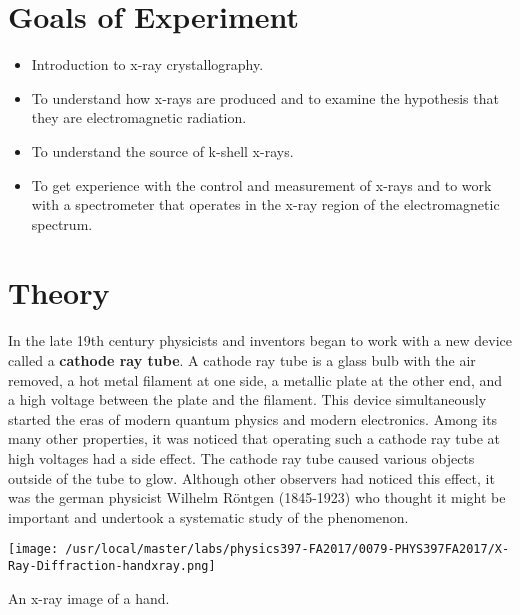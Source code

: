 \section{Goals of Experiment}
\begin{itemize}
\item Introduction to x-ray crystallography.
    \item To understand how x-rays are produced and to examine the hypothesis that they are electromagnetic radiation.
    \item To understand the source of k-shell x-rays.
    \item To get experience with the control and measurement of x-rays and to work with a spectrometer that operates in the x-ray region of the electromagnetic spectrum.
\end{itemize}

\section{Theory}
In the late 19th century physicists and inventors began to work with a new device called a {\bf cathode ray tube}. A cathode ray tube is a glass bulb with the air removed, a hot metal filament at one side, a metallic plate at the other end, and a high voltage between the plate and the filament. This device simultaneously started the eras of modern quantum physics and modern electronics. Among its many other properties, it was noticed that operating such a cathode ray tube at high voltages had a side effect. The cathode ray tube caused various objects outside of the tube to glow. Although other observers had noticed this effect, it was the german physicist Wilhelm R\"{o}ntgen (1845-1923) who thought it might be important and undertook a systematic study of the phenomenon.

\begin{marginfigure}
\texttt{[image: /usr/local/master/labs/physics397-FA2017/0079-PHYS397FA2017/X-Ray-Diffraction-handxray.png]}
\caption{An x-ray image of a hand.}
\label{fig:xr1}
\end{marginfigure}

